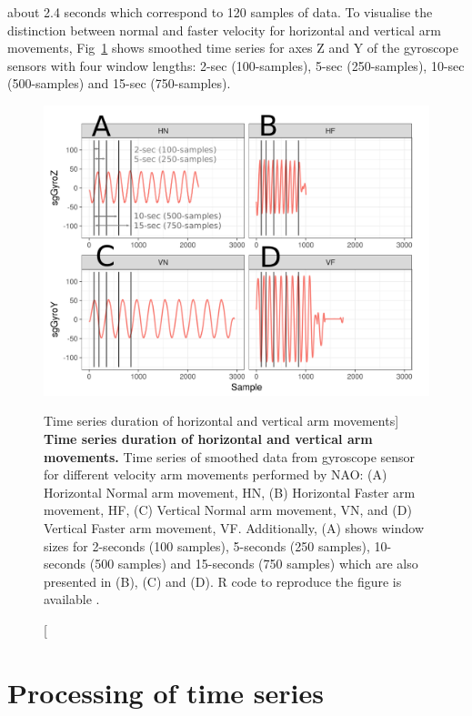 about 2.4 seconds which correspond to 120 samples of data.
To visualise the distinction between normal and faster velocity for horizontal 
and vertical arm movements, Fig~\ref{fig:sts} shows smoothed time series 
for axes Z and Y of the gyroscope sensors with four window lengths: 
2-sec (100-samples), 5-sec (250-samples), 10-sec (500-samples) 
and 15-sec (750-samples).
\begin{figure}
  \centering
  \includegraphics[width=1.0\textwidth]{sts}
    \caption
	[Time series duration of horizontal and vertical arm movements]{
	{\bf Time series duration of horizontal and vertical arm movements.} 
		Time series of smoothed data from gyroscope sensor 
		for different velocity arm movements performed by NAO: 
		(A) Horizontal Normal arm movement, HN, 
		(B) Horizontal Faster arm movement, HF,
		(C) Vertical Normal arm movement, VN, and 
		(D) Vertical Faster arm movement, VF.
		Additionally, (A) shows window sizes for 2-seconds 
		(100 samples), 5-seconds (250 samples), 
		10-seconds (500 samples) and 15-seconds (750 samples)
		which are also presented in (B), (C) and (D).
		R code to reproduce the figure is available \cite{hwum2018}.
        }
	\label{fig:sts}
\end{figure}

\section{Processing of time series} \label{sec:preparation_timeseries}

